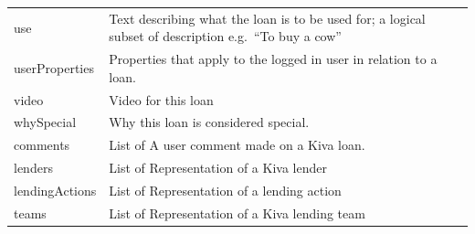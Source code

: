 \begin{longtable}{|p{}|p{}|}
	use                                  & Text describing what the loan is to be used for; a logical subset
	of description e.g.~``To buy a cow''                                                                     \\
	userProperties                       & Properties that apply to the logged in user in relation
	to a loan.                                                                                               \\
	video                                & Video for this loan                                               \\
	whySpecial                           & Why this loan is considered special.                              \\
	comments                             & List of A user comment made on a Kiva loan.                       \\
	lenders                              & List of Representation of a Kiva lender                           \\
	lendingActions                       & List of Representation of a lending action                        \\
	teams                                & List of Representation of a Kiva lending team                     \\
\end{longtable}


